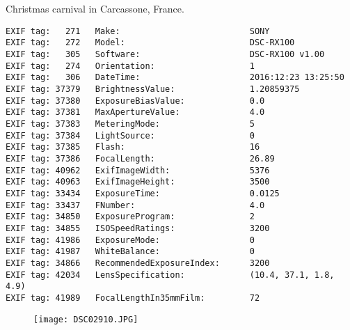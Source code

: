 \section{\protect{}}
\noindent Christmas carnival in Carcassone, France.
\noindent
\begin{lstlisting}
EXIF tag:   271   Make:                          SONY
EXIF tag:   272   Model:                         DSC-RX100
EXIF tag:   305   Software:                      DSC-RX100 v1.00
EXIF tag:   274   Orientation:                   1
EXIF tag:   306   DateTime:                      2016:12:23 13:25:50
EXIF tag: 37379   BrightnessValue:               1.20859375
EXIF tag: 37380   ExposureBiasValue:             0.0
EXIF tag: 37381   MaxApertureValue:              4.0
EXIF tag: 37383   MeteringMode:                  5
EXIF tag: 37384   LightSource:                   0
EXIF tag: 37385   Flash:                         16
EXIF tag: 37386   FocalLength:                   26.89
EXIF tag: 40962   ExifImageWidth:                5376
EXIF tag: 40963   ExifImageHeight:               3500
EXIF tag: 33434   ExposureTime:                  0.0125
EXIF tag: 33437   FNumber:                       4.0
EXIF tag: 34850   ExposureProgram:               2
EXIF tag: 34855   ISOSpeedRatings:               3200
EXIF tag: 41986   ExposureMode:                  0
EXIF tag: 41987   WhiteBalance:                  0
EXIF tag: 34866   RecommendedExposureIndex:      3200
EXIF tag: 42034   LensSpecification:             (10.4, 37.1, 1.8, 4.9)
EXIF tag: 41989   FocalLengthIn35mmFilm:         72

\end{lstlisting}
\clearpage
\begin{figure}
\raggedleft
\texttt{[image: DSC02910.JPG]}
\end{figure}


\clearpage
